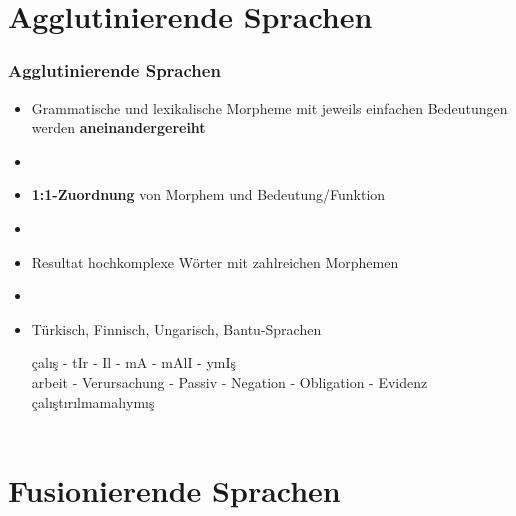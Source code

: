 \section{Agglutinierende Sprachen}


\begin{frame}
\frametitle{Agglutinierende Sprachen}

\begin{itemize}
	\item Grammatische und lexikalische Morpheme mit jeweils einfachen Bedeutungen werden \textbf{aneinandergereiht}
	\item[]
	\item \textbf{1:1-Zuordnung} von Morphem und Bedeutung/Funktion
	\item[]
	\item Resultat \ras hochkomplexe Wörter mit zahlreichen Morphemen
	\item[]
	\item Türkisch, Finnisch, Ungarisch, Bantu-Sprachen
	
	\ea
	\gll	çalış - tIr - Il - mA - mAlI - ymIş\\
			arbeit - Verursachung - Passiv - Negation - Obligation - Evidenz \\
			çalıştırılmamalıymış \\
			 \\
	\z
			
	
\end{itemize}


\end{frame}


\section{Fusionierende Sprachen}


